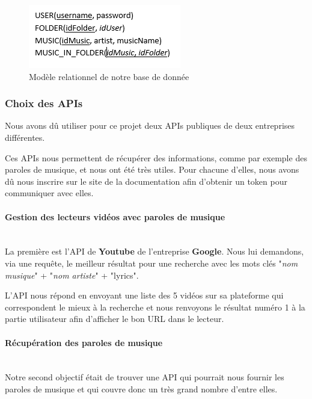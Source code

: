 \documentclass[12pt,french]{article}
\begin{document}
\begin{figure}[H]
	\centering
	\includegraphics[scale=1]{table.png}
	\caption{Modèle relationnel de notre base de donnée}    
\end{figure}


\subsubsection{Choix des APIs}

Nous avons dû utiliser pour ce projet deux \gls{API}s publiques de deux entreprises différentes.

\medskip

Ces \gls{API}s nous permettent de récupérer des informations, comme par exemple des paroles de musique, et nous ont été très utiles. Pour chacune d'elles, nous avons dû nous inscrire sur le site de la documentation afin d'obtenir un \gls{token} pour communiquer avec elles.

\paragraph{Gestion des lecteurs vidéos avec paroles de musique \\\\}

La première est l'\gls{API} de \textbf{Youtube} de l'entreprise \textbf{Google}. Nous lui demandons, via une requête, le meilleur résultat pour une recherche avec les mots clés "\textit{nom musique}" + "\textit{nom artiste}" + "lyrics".

L'\gls{API} nous répond en envoyant une liste des 5 vidéos sur sa plateforme qui correspondent le mieux à la recherche et nous renvoyons le résultat numéro 1 à la partie utilisateur afin d'afficher le bon URL dans le lecteur.

\paragraph{Récupération des paroles de musique \\\\}

Notre second objectif était de trouver une \gls{API} qui pourrait nous fournir les paroles de musique et qui couvre donc un très grand nombre d'entre elles.
\end{document}
